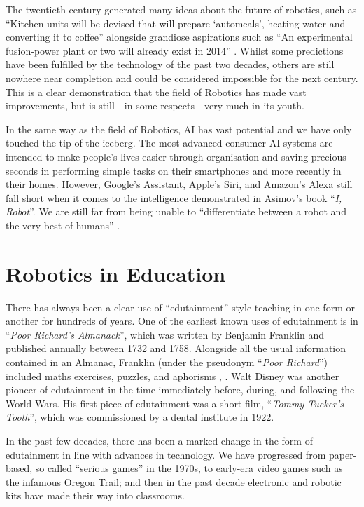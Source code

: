\documentclass{report}
\newcommand{\propernoun}[1]{\enquote{\textit{#1}}}
\begin{document}
    The twentieth century generated many ideas about the future of robotics, such as \enquote{Kitchen units will be devised that will prepare \enquote{automeals}, heating water and converting it to coffee} alongside grandiose aspirations such as \enquote{An experimental fusion-power plant or two will already exist in 2014} \cite{Asimov1964b}. Whilst some predictions have been fulfilled by the technology of the past two decades, others are still nowhere near completion and could be considered impossible for the next century. This is a clear demonstration that the field of Robotics has made vast improvements, but is still - in some respects - very much in its youth.
    
    In the same way as the field of Robotics, AI has vast potential and we have only touched the tip of the iceberg. The most advanced consumer AI systems are intended to make people's lives easier through organisation and saving precious seconds in performing simple tasks on their smartphones and more recently in their homes. However, Google's Assistant, Apple's Siri, and Amazon's Alexa still fall short when it comes to the intelligence demonstrated in Asimov's book \propernoun{I, Robot}. We are still far from being unable to \enquote{differentiate between a robot and the very best of humans} \cite{Asimov1970}.
    
    \section{Robotics in Education}
    There has always been a clear use of \enquote{edutainment} style teaching in one form or another for hundreds of years. One of the earliest known uses of edutainment is in \propernoun{Poor Richard's Almanack}, which was written by Benjamin Franklin and published annually between 1732 and 1758. Alongside all the usual information contained in an Almanac, Franklin (under the pseudonym \propernoun{Poor Richard}) included maths exercises, puzzles, and aphorisms \cite{Beato2015}, \cite{Franklin1732}. Walt Disney was another pioneer of edutainment in the time immediately before, during, and following the World Wars. His first piece of edutainment was a short film, \propernoun{Tommy Tucker's Tooth}, which was commissioned by a dental institute in 1922.
    
    In the past few decades, there has been a marked change in the form of edutainment in line with advances in technology. We have progressed from paper-based, so called \enquote{serious games} in the 1970s, to early-era video games such as the infamous Oregon Trail; and then in the past decade electronic and robotic kits have made their way into classrooms.
    
\end{document}
